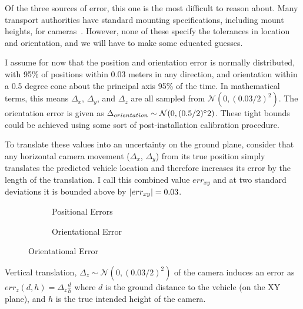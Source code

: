 \documentclass[a4paper,12pt,twoside,openright]{report}
\begin{document}
Of the three sources of error, this one is the most difficult to reason about. 
Many transport authorities have standard mounting specifications, including mount heights, for cameras~\cite{StreetscapeGuideance}.
However, none of these specify the tolerances in location and orientation, and we will have to make some educated guesses.

I assume for now that the position and orientation error is normally distributed, with
95\% of positions within 0.03 meters in any direction, 
and orientation within a 0.5 degree cone about the principal axis 95\% of the time.
In mathematical terms, this means $\Delta_{x}$, $\Delta_{y}$, and $\Delta_{z}$ 
are all sampled from $\mathcal{N}(0, (0.03/2)^2)$. The orientation error is given as
$\Delta_{orientation} \sim \mathcal{N}(0, (0.5/2)\degree2)$.
These tight bounds could be achieved using some sort of post-installation 
calibration procedure. 



To translate these values into an uncertainty on the ground plane, consider that
any horizontal camera movement ($\Delta_{x}$, $\Delta_{y}$) from its true position simply translates
the predicted vehicle location and therefore increases its error by the length of the translation.
I call this combined value $err_{xy}$ and at two standard deviations it is bounded above by
$\abs{err_{xy}} = 0.03$.

\begin{figure}[htb]
\centering
\begin{subfigure}[b]{.45\textwidth}
  \centering
  \resizebox{\linewidth}{!}{} 
  \caption{Positional Errors}
  \label{fig:camera:xyz error}
\end{subfigure}%
\begin{subfigure}[b]{.45\textwidth}
  \centering
  \resizebox{\linewidth}{!}{}
  \caption{Orientational Error}
  \label{fig:camera:orient error}
\end{subfigure}
\label{fig:camera:errors}
\end{figure}
Vertical translation, $\Delta_z\sim \mathcal{N}(0, (0.03/2)^2)$
of the camera induces an error as $err_{z}(d, h) = \Delta_z \frac{d}{h}$ %
where $d$ is the ground distance to the vehicle (on the XY plane), and $h$ is the true intended
height of the camera.
\end{document}

